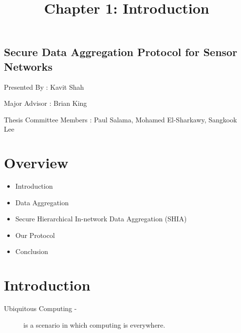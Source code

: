\documentclass[%
  slidesonly,%
  semlayer%
  ]{seminar}                                  %
\title{Chapter 1: Introduction}
\author{}
\date{}
\date{}
\begin{document}


\maketitle          %

\begin{slide}
  \ifslidesonly              %
    \addtocounter{slide}{-1}
  \fi
\end{slide}


\begin{slide}

\footnotesize

\begin{center}
\section*{Secure Data Aggregation Protocol for Sensor Networks}
  \vfill
  Presented By : Kavit Shah

  Major Advisor : Brian King
  
  Thesis Committee Members : Paul Salama, Mohamed El-Sharkawy, Sangkook Lee
  \vfill
  \end{center}
  \clearpage

\section*{Overview}
  \vfill
  \begin{center}
    \begin{itemize}
      \item Introduction
      \item Data Aggregation
      \item Secure Hierarchical In-network Data Aggregation (SHIA)
      \item Our Protocol
      \item Conclusion
    \end{itemize}
  \end{center}
  \vfill
  \clearpage

\section*{Introduction}
  \vfill
  \begin{description}
    \item[Ubiquitous Computing -] is a scenario in which computing is everywhere.


\end{description}
\end{slide}
\end{document}
